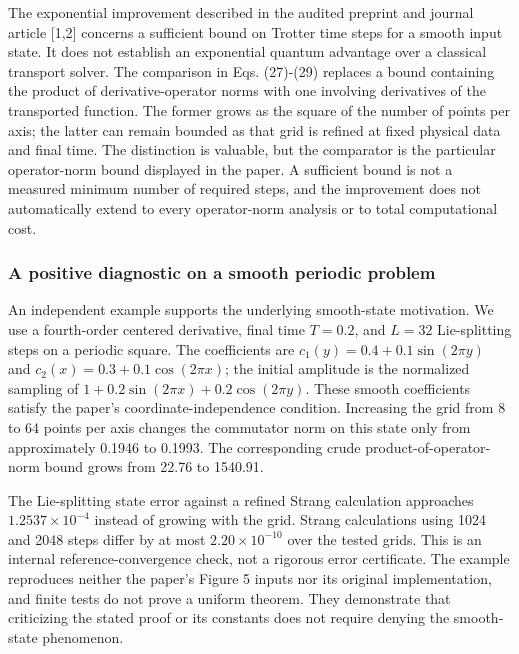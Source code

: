 The exponential improvement described in the audited preprint and
journal article {[}1,2{]} concerns a sufficient bound on Trotter time
steps for a smooth input state. It does not establish an exponential
quantum advantage over a classical transport solver. The comparison in
Eqs. (27)-(29) replaces a bound containing the product of
derivative-operator norms with one involving derivatives of the
transported function. The former grows as the square of the number of
points per axis; the latter can remain bounded as that grid is refined
at fixed physical data and final time. The distinction is valuable, but
the comparator is the particular operator-norm bound displayed in the
paper. A sufficient bound is not a measured minimum number of required
steps, and the improvement does not automatically extend to every
operator-norm analysis or to total computational cost.

\subsubsection{A positive diagnostic on a smooth periodic
problem}\label{a-positive-diagnostic-on-a-smooth-periodic-problem}

An independent example supports the underlying smooth-state motivation.
We use a fourth-order centered derivative, final time \(T=0.2\), and
\(L=32\) Lie-splitting steps on a periodic square. The coefficients are
\(c_1(y)=0.4+0.1\sin(2\pi y)\) and \(c_2(x)=0.3+0.1\cos(2\pi x)\); the
initial amplitude is the normalized sampling of
\(1+0.2\sin(2\pi x)+0.2\cos(2\pi y)\). These smooth coefficients satisfy
the paper's coordinate-independence condition. Increasing the grid from
8 to 64 points per axis changes the commutator norm on this state only
from approximately 0.1946 to 0.1993. The corresponding crude
product-of-operator-norm bound grows from 22.76 to 1540.91.

The Lie-splitting state error against a refined Strang calculation
approaches \(1.2537\times10^{-4}\) instead of growing with the grid.
Strang calculations using 1024 and 2048 steps differ by at most
\(2.20\times10^{-10}\) over the tested grids. This is an internal
reference-convergence check, not a rigorous error certificate. The
example reproduces neither the paper's Figure 5 inputs nor its original
implementation, and finite tests do not prove a uniform theorem. They
demonstrate that criticizing the stated proof or its constants does not
require denying the smooth-state phenomenon.

